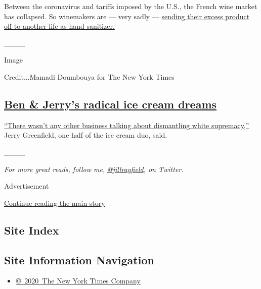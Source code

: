 Between the coronavirus and tariffs imposed by the U.S., the French wine
market has collapsed. So winemakers are --- very sadly ---
\href{https://www.nytimes.com/2020/07/27/world/europe/france-alsace-wine-coronavirus.html}{sending
their excess product off to another life as hand sanitizer.}

\_\_\_\_

Image

Credit...Mamadi Doumbouya for The New York Times

\hypertarget{ben--jerrys-radical-ice-cream-dreams}{%
\subsection{\texorpdfstring{\href{https://www.nytimes.com/interactive/2020/07/27/magazine/ben-jerry-interview.html}{Ben
\& Jerry's radical ice cream
dreams}}{Ben \& Jerry's radical ice cream dreams}}\label{ben--jerrys-radical-ice-cream-dreams}}

\href{https://www.nytimes.com/interactive/2020/07/27/magazine/ben-jerry-interview.html}{``There
wasn't any other business talking about dismantling white supremacy,''}
Jerry Greenfield, one half of the ice cream duo, said.

\_\_\_\_

\emph{For more great reads, follow me,}
\href{https://twitter.com/jillrayfield}{\emph{@jillrayfield}}\emph{, on
Twitter.}

Advertisement

\protect\hyperlink{after-bottom}{Continue reading the main story}

\hypertarget{site-index}{%
\subsection{Site Index}\label{site-index}}

\hypertarget{site-information-navigation}{%
\subsection{Site Information
Navigation}\label{site-information-navigation}}

\begin{itemize}
\tightlist
\item
  \href{https://help.nytimes.com/hc/en-us/articles/115014792127-Copyright-notice}{©~2020~The
  New York Times Company}
\end{itemize}

